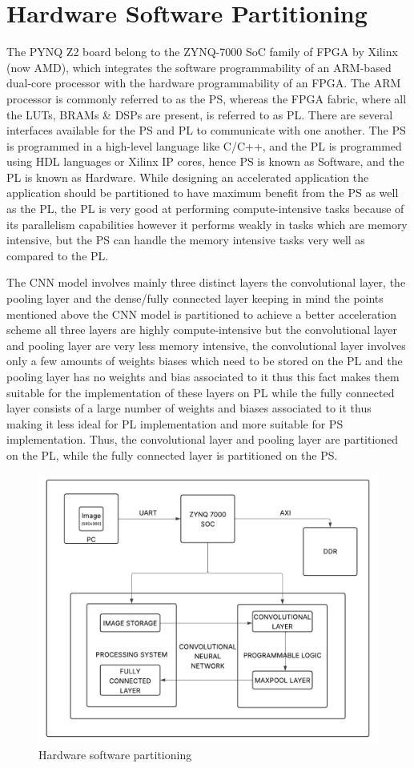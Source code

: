     \section{Hardware Software Partitioning}
    \noindent
    The PYNQ Z2 board belong to the ZYNQ-7000 SoC family of FPGA by Xilinx (now AMD), which integrates the software programmability of an ARM-based dual-core processor with the hardware programmability of an FPGA. The ARM processor is commonly referred to as the PS, whereas the FPGA fabric, where all the LUTs, BRAMs \& DSPs are present, is referred to as PL. There are several interfaces available for the PS and PL to communicate with one another. The PS is programmed in a high-level language like C/C++, and the PL is programmed using HDL languages or Xilinx IP cores, hence PS is known as Software, and the PL is known as Hardware. While designing an accelerated application the application should be partitioned to have maximum benefit from the PS as well as the PL, the PL is very good at performing compute-intensive tasks because of its parallelism capabilities however it performs weakly in tasks which are memory intensive, but the PS can handle the memory intensive tasks very well as compared to the PL. \par \noindent
    The CNN model involves mainly three distinct layers the convolutional layer, the pooling layer and the dense/fully connected layer keeping in mind the points mentioned above the CNN model is partitioned to achieve a better acceleration scheme all three layers are highly compute-intensive but the convolutional layer and pooling layer are very less memory intensive, the convolutional layer involves only a few amounts of weights biases which need to be stored on the PL and the pooling layer has no weights and bias associated to it thus this fact makes them suitable for the implementation of these layers on PL while the fully connected layer consists of a large number of weights and biases associated to it thus making it less ideal for PL implementation and more suitable for PS implementation. Thus, the convolutional layer and pooling layer are partitioned on the PL, while the fully connected layer is partitioned on the PS.
    \begin{figure}
        \centering
        \includegraphics[width=0.8\linewidth]{images/diag_final.png}
        \caption{Hardware software partitioning}
        \label{fig:Hardware Software partitioning}
    \end{figure}
    
